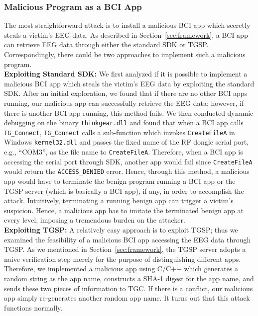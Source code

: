 \subsubsection{Malicious Program as a BCI App}
The most straightforward attack is to install a malicious BCI app which secretly steals a victim's EEG data. As described in Section~\ref{sec:framework}, a BCI app can retrieve EEG data through either the standard SDK or TGSP. Correspondingly, there could be two approaches to implement such a malicious program. \\
\indent \textbf{Exploiting Standard SDK:} We first analyzed  if it is possible to implement a malicious BCI app which steals the victim's EEG data by exploiting the standard SDK. After an initial exploration, we found that if there are no other BCI apps running, our malicious app can successfully retrieve the EEG data; however, if there is another BCI app running, this method fails. We then  conducted dynamic debugging on the binary \texttt{thinkgear.dll} and found that when a BCI app calls \texttt{TG\_Connect}, \texttt{TG\_Connect} calls a sub-function which invokes \texttt{CreateFileA} in Windows \texttt{kernel32.dll} and passes the fixed name of the RF dongle serial port, e.g., ``COM3'', as the file name to \texttt{CreateFileA}. Therefore, when a BCI app is accessing the serial port through SDK, another app would fail since \texttt{CreateFileA} would return the \texttt{ACCESS\_DENIED} error. Hence, through this method, a malicious app would have to terminate the benign program running a BCI app or the TGSP server (which is basically a BCI app), if any, in order to accomplish the attack. Intuitively, terminating a running benign app can trigger a victim's suspicion. Hence, a malicious app has to imitate the terminated benign app at every level, imposing a tremendous burden on the attacker. \\
\indent \textbf{Exploiting TGSP:} A relatively easy approach is to exploit TGSP; thus we examined the feasibility of a malicious BCI app accessing the EEG data through TGSP. As we mentioned in Section~\ref{sec:framework}, the TGSP server adopts a naive verification step merely for the purpose of distinguishing different apps. Therefore, we implemented a malicious app using C/C++ which generates a random string as the app name, constructs a SHA-1 digest for the app name, and sends these two pieces of information to TGC. If there is a conflict, our malicious app simply re-generates another random app name. It turns out that this attack functions normally.

